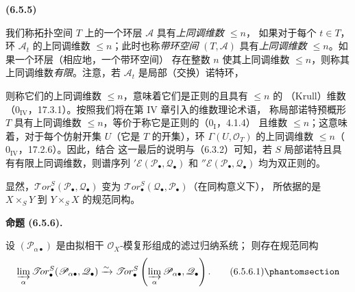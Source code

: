 \documentclass[UTF8,fontset=none,11pt,oneside,openany]{ctexbook}
\newenvironment{env}[1][]{%
  \par\medskip\noindent\textbf{(#1)}\ %
}{\par}
\newenvironment{proposition}[1][]{%
  \par\medskip\noindent\textbf{命题 (#1).}\ %
}{\par}
\newcommand{\oldpage}[2][]{%
  \hypertarget{ega-source-page-#1-#2}{}%
  \marginnote{\scriptsize\textbf{#1}~|~#2}\ignorespaces}
\let\EGAOriginalLabel\label
\renewcommand{\label}[1]{\phantomsection\EGAOriginalLabel{#1}}
\begin{document}
\begin{env}[6.5.5]
我们称拓扑空间 $T$ 上的一个环层 $\mathscr A$ 具有\emph{上同调维数 $\leqslant n$}，
如果对于每个 $t\in T$，环 $\mathscr A_t$ 的上同调维数 $\leqslant n$；此时也称\emph{带环空间}
$(T,\mathscr A)$ 具有\emph{上同调维数 $\leqslant n$}。如果一个环层（相应地，一个带环空间）
存在整数 $n$ 使其上同调维数 $\leqslant n$，则称其上同调维数\emph{有限}。注意，若
$\mathscr A_t$ 是局部（交换）诺特环，

\oldpage[III]{150}
则称它们的上同调维数 $\leqslant n$，意味着它们是正则的且具有 $\leqslant n$ 的
（Krull）维数（$0_{\mathrm{IV}}$，17.3.1）。按照我们将在第 IV 章引入的维数理论术语，
称局部诺特预概形 $T$ 具有上同调维数 $\leqslant n$，等价于称它是正则的（$0_{\mathrm I}$，4.1.4）
且维数 $\leqslant n$；这意味着，对于每个仿射开集 $U$（它是 $T$ 的开集），环
$\Gamma(U,\mathscr O_T)$ 的上同调维数 $\leqslant n$（$0_{\mathrm{IV}}$，17.2.6）。因此，结合
这一最后的说明与（6.3.2）可知，若 $S$ 局部诺特且具有有限上同调维数，则谱序列
$'\mathscr E(\mathscr P_\bullet,\mathscr Q_\bullet)$ 和
$''\mathscr E(\mathscr P_\bullet,\mathscr Q_\bullet)$ 均为双正则的。

显然，$\mathscr{T}\!or_\bullet^S(\mathscr P_\bullet,\mathscr Q_\bullet)$
变为 $\mathscr{T}\!or_\bullet^S(\mathscr Q_\bullet,\mathscr P_\bullet)$（在同构意义下），
所依据的是 $X\times_S Y$ 到 $Y\times_S X$ 的规范同构。
\end{env}
\begin{proposition}[6.5.6]
设 $(\mathscr P_{\alpha\bullet})$ 是由拟相干 $\mathscr O_X$-模复形组成的滤过归纳系统；
则存在规范同构
\[
  \varinjlim_\alpha
  \mathscr{T}\!or_\bullet^S
  (\mathscr P_{\alpha\bullet},\mathscr Q_\bullet)
  \xrightarrow{\sim}
  \mathscr{T}\!or_\bullet^S
  \left(\varinjlim_\alpha\mathscr P_{\alpha\bullet},\mathscr Q_\bullet\right).
  \tag{6.5.6.1}\label{III.6.5.6.1-fr}
\]
\end{proposition}
\end{document}
